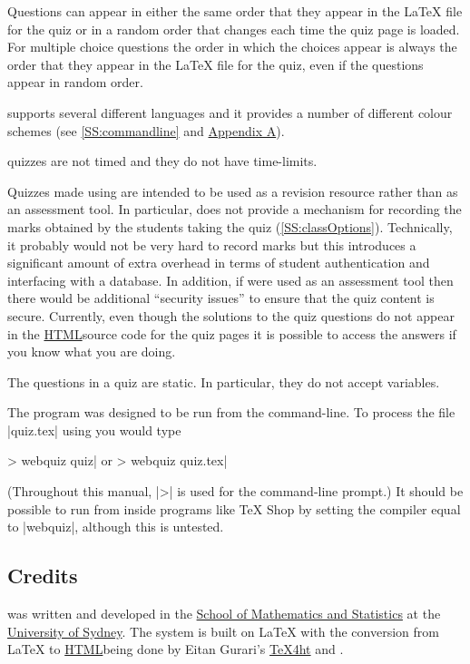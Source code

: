 \documentclass[svgnames]{article}
\newcommand\TeXfht{\href{https://www.ctan.org/tex4ht}{TeX4ht}\xspace}
\newcommand{\HTML}{\href{https://www.w3schools.com/html/html_intro.asp}{HTML}}
\begin{document}
      Questions can appear in either the same order that they appear in
      the \LaTeX{} file for the quiz or in a random order that changes
      each time the quiz page is loaded. For multiple choice questions the
      order in which the choices appear is always the order that they
      appear in the \LaTeX{} file for the quiz, even if the questions
      appear in random order.

      \WebQuiz supports several different languages and it
      provides a number of different colour schemes (see
      \autoref{SS:commandline} and \hyperref[SS:themes]{Appendix A}).

      \WebQuiz quizzes are not timed and they do not have time-limits.

      Quizzes made using \WebQuiz are intended to be used as a
      revision resource rather than as an assessment tool. In particular,
      \WebQuiz does not provide a mechanism for recording the marks
      obtained by the students taking the quiz
      (\autoref{SS:classOptions}). Technically, it probably would not be
      very hard to record marks but this introduces a significant amount
      of extra overhead in terms of student authentication and interfacing
      with a database. In addition, if \WebQuiz were used as an assessment
      tool then there would be additional ``security issues'' to ensure
      that the quiz content is secure. Currently, even though the
      solutions to the quiz questions do not appear in the \HTML source
      code for the quiz pages it is possible to access the answers if you
      know what you are doing.

      The questions in a \WebQuiz quiz are static. In particular, they do
      not accept variables.

      The \WebQuiz program was designed to be run from the command-line.
      To process the file \BashCode|quiz.tex| using \WebQuiz you would
      type
      \begin{bashcode}
      > webquiz quiz|         or         > webquiz quiz.tex|
      \end{bashcode}
      (Throughout this manual, \BashCode|>| is used for the command-line
      prompt.) 
      It should be possible to run \WebQuiz from inside programs like \TeX
      Shop by setting the compiler equal to \BashCode|webquiz|, although
      this is untested.

  \subsection{Credits}
      \WebQuiz{} was written and developed in the
      \href{http://www.maths.usyd.edu.au/}{School of Mathematics and
      Statistics} at the \href{http://www.usyd.edu.au/}{University of
      Sydney}.  The system is built on \LaTeX{} with the conversion from
      \LaTeX{} to \HTML being done by Eitan Gurari's
      \TeXfht and .
\end{document}
